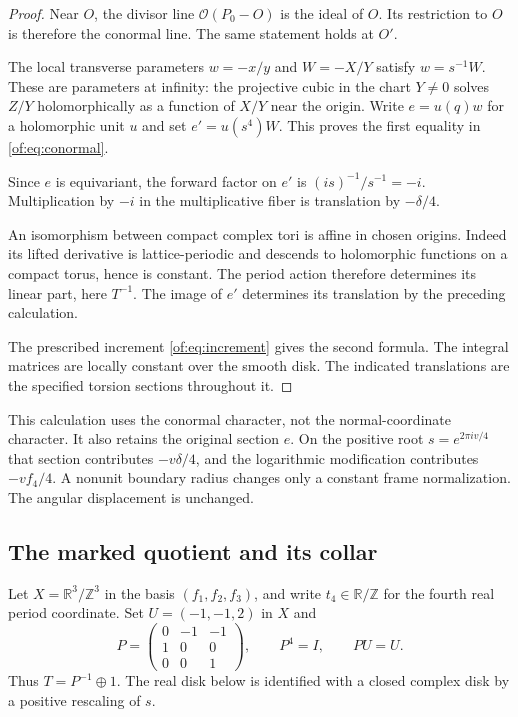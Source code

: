 \begin{proof}
Near $O$, the divisor line $\mathcal O(P_0-O)$ is the ideal of $O$.
Its restriction to $O$ is therefore the conormal line.
The same statement holds at $O'$.

The local transverse parameters $w=-x/y$ and $W=-X/Y$ satisfy
$w=s^{-1}W$. These are parameters at infinity: the projective cubic in
the chart $Y\ne0$ solves $Z/Y$ holomorphically as a function of $X/Y$
near the origin. Write $e=u(q)w$ for a holomorphic unit $u$ and set
$e'=u(s^4)W$. This proves the first equality in \eqref{of:eq:conormal}.

Since $e$ is equivariant, the forward factor on $e'$ is
$(is)^{-1}/s^{-1}=-i$. Multiplication by $-i$ in the multiplicative fiber
is translation by $-\delta/4$.

An isomorphism between compact complex tori is affine in chosen origins.
Indeed its lifted derivative is lattice-periodic and descends to holomorphic
functions on a compact torus, hence is constant.
The period action therefore determines its linear part, here $T^{-1}$.
The image of $e'$ determines its translation by the preceding calculation.

The prescribed increment \eqref{of:eq:increment} gives the second formula.
The integral matrices are locally constant over the smooth disk.
The indicated translations are the specified torsion sections throughout it.
\end{proof}

This calculation uses the conormal character, not the normal-coordinate
character. It also retains the original section $e$.
On the positive root $s=e^{2\pi iv/4}$ that section contributes
$-v\delta/4$, and the logarithmic modification contributes $-vf_4/4$.
A nonunit boundary radius changes only a constant frame normalization.
The angular displacement is unchanged.

\subsection{The marked quotient and its collar}

Let $X=\mathbb R^3/\mathbb Z^3$ in the basis $(f_1,f_2,f_3)$, and write
$t_4\in\mathbb R/\mathbb Z$ for the fourth real period coordinate.
Set $U=(-1,-1,2)$ in $X$ and
\begin{equation}\label{of:eq:P}
 P=\begin{pmatrix}0&-1&-1\\1&0&0\\0&0&1\end{pmatrix},
 \qquad P^4=I,\qquad PU=U.
\end{equation}
Thus $T=P^{-1}\oplus1$.
The real disk below is identified with a closed complex disk by a positive
rescaling of $s$.

